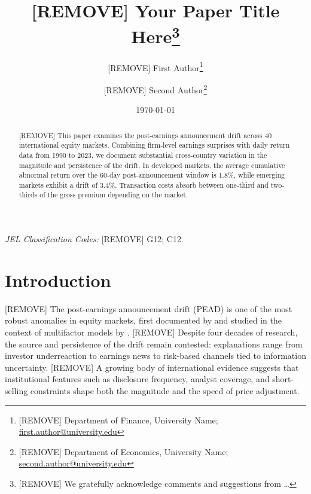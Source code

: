 \documentclass[12pt]{article}
\title{
	{\textbf{[REMOVE] Your Paper Title Here}}\thanks{{\scriptsize
	[REMOVE] We gratefully acknowledge comments and suggestions from \ldots
}}
}
\author{
{\normalsize [REMOVE] First Author\thanks{{\scriptsize
[REMOVE] Department of Finance, University Name; \url{first.author@university.edu}}}}
\and
{\normalsize [REMOVE] Second Author\thanks{{\scriptsize
[REMOVE] Department of Economics, University Name; \url{second.author@university.edu}}}}
}
\date{{\small   \today }}
\begin{document}
\maketitle

\vspace{-.75cm}

\begin{abstract}
\singlespacing
\noindent
{[REMOVE] This paper examines the post-earnings announcement drift across 40 international equity markets. Combining firm-level earnings surprises with daily return data from 1990 to 2023, we document substantial cross-country variation in the magnitude and persistence of the drift. In developed markets, the average cumulative abnormal return over the 60-day post-announcement window is 1.8\%, while emerging markets exhibit a drift of 3.4\%. Transaction costs absorb between one-third and two-thirds of the gross premium depending on the market.}
\end{abstract}
\bigskip
{}
\medskip

\noindent \emph{JEL Classification Codes:} [REMOVE] G12; C12.
\bigskip
\thispagestyle{empty}

\pagebreak
\setcounter{page}{1}
\onehalfspacing
{}
\setlength{\belowdisplayskip}{5pt}
\setlength{\belowdisplayshortskip}{5pt}
\setlength{\abovedisplayskip}{5pt}
\setlength{\abovedisplayshortskip}{5pt}


\clearpage

\section{Introduction}\label{sec:intro}

[REMOVE] The post-earnings announcement drift (PEAD) is one of the most robust anomalies in equity markets, first documented by \citet{FamaFrench_1992} and studied in the context of multifactor models by \citet{FamaFrench_1993}. [REMOVE] Despite four decades of research, the source and persistence of the drift remain contested: explanations range from investor underreaction to earnings news to risk-based channels tied to information uncertainty. [REMOVE] A growing body of international evidence suggests that institutional features such as disclosure frequency, analyst coverage, and short-selling constraints shape both the magnitude and the speed of price adjustment.
\end{document}
